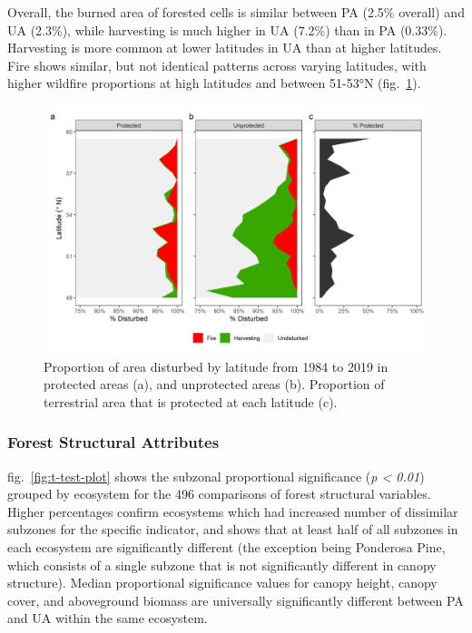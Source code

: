 \documentclass[10pt,oneside]{article}
\makeatletter
\def\maxwidth{\ifdim\Gin@nat@width>\linewidth\linewidth
\else\Gin@nat@width\fi}
\let\Oldincludegraphics\includegraphics
\renewcommand{\includegraphics}[1]{\Oldincludegraphics[width=\maxwidth]{#1}}
\makeatother
\begin{document}
Overall, the burned area of forested cells is similar between PA (2.5\%
overall) and UA (2.3\%), while harvesting is much higher in UA (7.2\%)
than in PA (0.33\%). Harvesting is more common at lower latitudes in UA
than at higher latitudes. Fire shows similar, but not identical patterns
across varying latitudes, with higher wildfire proportions at high
latitudes and between 51-53°N (fig.~\ref{fig:lat-dist}).

\begin{figure}
\hypertarget{fig:lat-dist}{%
\centering
\includegraphics{figures/latitude_disturbance_plot.png}
\caption{Proportion of area disturbed by latitude from 1984 to 2019 in
protected areas (a), and unprotected areas (b). Proportion of
terrestrial area that is protected at each latitude
(c).}\label{fig:lat-dist}
}
\end{figure}

\hypertarget{forest-structural-attributes-1}{%
\subsubsection{Forest Structural
Attributes}\label{forest-structural-attributes-1}}

fig.~\ref{fig:t-test-plot} shows the subzonal proportional significance
(\emph{p \textless{} 0.01}) grouped by ecosystem for the 496 comparisons
of forest structural variables. Higher percentages confirm ecosystems
which had increased number of dissimilar subzones for the specific
indicator, and shows that at least half of all subzones in each
ecosystem are significantly different (the exception being Ponderosa
Pine, which consists of a single subzone that is not significantly
different in canopy structure). Median proportional significance values
for canopy height, canopy cover, and aboveground biomass are universally
significantly different between PA and UA within the same ecosystem.
\end{document}
